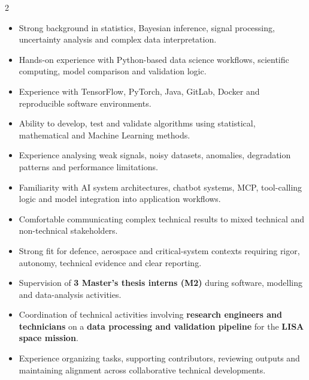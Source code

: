 \documentclass[8pt,a4paper,ragged2e,withhyper]{altacv}
\begin{document}
\begin{paracol}{2}

\begin{itemize}
  \item Strong background in statistics, Bayesian inference, signal processing, uncertainty analysis and complex data interpretation.
  \item Hands-on experience with Python-based data science workflows, scientific computing, model comparison and validation logic.
  \item Experience with TensorFlow, PyTorch, Java, GitLab, Docker and reproducible software environments.
  \item Ability to develop, test and validate algorithms using statistical, mathematical and Machine Learning methods.
  \item Experience analysing weak signals, noisy datasets, anomalies, degradation patterns and performance limitations.
  \item Familiarity with AI system architectures, chatbot systems, MCP, tool-calling logic and model integration into application workflows.
  \item Comfortable communicating complex technical results to mixed technical and non-technical stakeholders.
  \item Strong fit for defence, aerospace and critical-system contexts requiring rigor, autonomy, technical evidence and clear reporting.
\end{itemize}


\begin{itemize}
  \item Supervision of \textbf{3 Master's thesis interns (M2)} during software, modelling and data-analysis activities.
  \item Coordination of technical activities involving \textbf{research engineers and technicians} on a \textbf{data processing and validation pipeline} for the \textbf{LISA space mission}.
  \item Experience organizing tasks, supporting contributors, reviewing outputs and maintaining alignment across collaborative technical developments.
\end{itemize}


\divider
{}
\divider

\medskip



\end{paracol}
\end{document}
